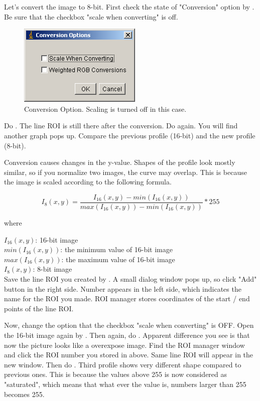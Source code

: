 \begin{indentexercise}{1}
Let's convert the image to 8-bit. First check the state
of "Conversion" option by
. Be
sure that the checkbox "scale when
converting" is off. 

\begin{figure}[htbp]
\begin{center}
\includegraphics[width=5.847cm,height=3.863cm]{img/CMCIBasicCourse201102-img8.png}
\caption{Conversion Option. Scaling is turned off in this case. }
\label{fig:img8}
\end{center}
\end{figure}


Do . The line
ROI is still there after the conversion. Do again. 
You will find another graph pops up. Compare the previous profile (16-bit) and the new profile (8-bit).

Conversion causes changes in the y-value. Shapes of the profile look
mostly similar, so if you normalize two images, the curve may overlap.
This is because the image is scaled according to the following
formula.

\[
I_{8}(x,y) = \frac{I_{16}(x, y) - min(I_{16}(x,y))}{ max(I_{16}(x,y)) -  min(I_{16}(x,y))} *255
\]

where

$I_{16}(x, y)$: 16-bit image\\
$min(I_{16}(x,y))$: the minimum value of 16-bit image\\
$max(I_{16}(x,y))$: the maximum value of 16-bit image\\
$I_{8}(x, y)$: 8-bit image\\


Save the line ROI you created by . A small dialog window pops up, so
click "Add" button in the right side.
Number appears in the left side, which indicates the name for the ROI
you made. ROI manager stores coordinates of the start / end points of
the line ROI.

Now, change the option  that the checkbox "scale when
converting" is OFF. Open the 16-bit image again by
. Then
again, do .
Apparent difference you see is that now the picture looks like a
overexpose image. Find the ROI manager window and click the ROI number
you stored in above. Same line ROI will appear in the new window. Then
do . Third profile
shows very different shape compared to previous ones. This is because
the values above 255 is now considered as
"saturated", which means that what ever the
value is, numbers larger than 255 becomes 255.


\end{indentexercise}
